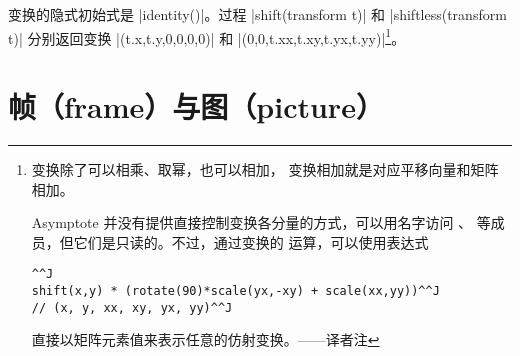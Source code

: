 \documentclass[nofonts,CJKnormalspaces]{ctexbook}[2009/05/20]
\newcommand*\prgname[1]{\textsf{#1}}
\newcommand\transnote[1]{\footnote{#1——译者注}}
\begin{document}
变换的隐式初始式是 |identity()|。过程 |shift(transform t)| 和
|shiftless(transform t)| 分别返回变换 |(t.x,t.y,0,0,0,0)| 和
|(0,0,t.xx,t.xy,t.yx,t.yy)|\transnote{变换除了可以相乘、取幂，也可以相加，
变换相加就是对应平移向量和矩阵相加。\par
\prgname{Asymptote} 并没有提供直接控制变换各分量的方式，可以用名字访问
\inlinecode{xx}、\inlinecode{xy} 等成员，但它们是只读的。不过，通过变换的
运算，可以使用表达式
\begin{lstlisting}^^J
shift(x,y) * (rotate(90)*scale(yx,-xy) + scale(xx,yy))^^J
// (x, y, xx, xy, yx, yy)^^J
\end{lstlisting}
直接以矩阵元素值来表示任意的仿射变换。}。




\section{帧（frame）与图（picture）}
\label{sec:framepicture}
\end{document}
